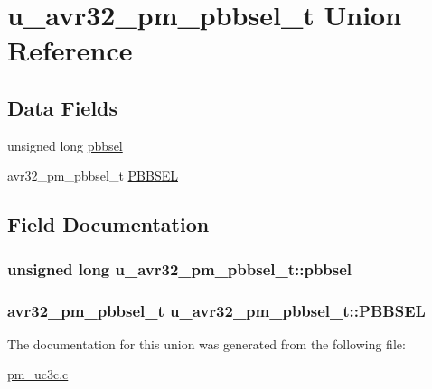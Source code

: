 \hypertarget{unionu__avr32__pm__pbbsel__t}{
\section{u\-\_\-avr32\-\_\-pm\-\_\-pbbsel\-\_\-t \-Union \-Reference}
\label{unionu__avr32__pm__pbbsel__t}
}
\subsection*{\-Data \-Fields}
\begin{DoxyCompactItemize}
\item 
unsigned long \hyperlink{unionu__avr32__pm__pbbsel__t_a6bd99c4d0ec4969d71a6ed09632bb443}{pbbsel}
\item 
avr32\-\_\-pm\-\_\-pbbsel\-\_\-t \hyperlink{unionu__avr32__pm__pbbsel__t_a14071796eb65ec361d99703ff6fd08fc}{\-P\-B\-B\-S\-E\-L}
\end{DoxyCompactItemize}


\subsection{\-Field \-Documentation}
\hypertarget{unionu__avr32__pm__pbbsel__t_a6bd99c4d0ec4969d71a6ed09632bb443}{
\subsubsection[{pbbsel}]{\setlength{\rightskip}{0pt plus 5cm}unsigned long {\bf u\-\_\-avr32\-\_\-pm\-\_\-pbbsel\-\_\-t\-::pbbsel}}}
\label{unionu__avr32__pm__pbbsel__t_a6bd99c4d0ec4969d71a6ed09632bb443}
\hypertarget{unionu__avr32__pm__pbbsel__t_a14071796eb65ec361d99703ff6fd08fc}{
\subsubsection[{\-P\-B\-B\-S\-E\-L}]{\setlength{\rightskip}{0pt plus 5cm}avr32\-\_\-pm\-\_\-pbbsel\-\_\-t {\bf u\-\_\-avr32\-\_\-pm\-\_\-pbbsel\-\_\-t\-::\-P\-B\-B\-S\-E\-L}}}
\label{unionu__avr32__pm__pbbsel__t_a14071796eb65ec361d99703ff6fd08fc}


\-The documentation for this union was generated from the following file\-:\begin{DoxyCompactItemize}
\item 
\hyperlink{pm__uc3c_8c}{pm\-\_\-uc3c.\-c}\end{DoxyCompactItemize}
